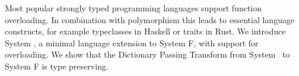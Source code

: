 Most popular strongly typed programming languages support function overloading. 
In combination with polymorphism this leads to essential language constructs, for example typeclasses in Haskell or traits in Rust.  
We introduce System \Fo, a minimal language extension to System F, with support for overloading.
We show that the Dictionary Passing Transform from System \Fo\ to System F is type preserving.